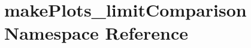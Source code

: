 \hypertarget{namespacemakePlots__limitComparison}{
\section{makePlots\_\-limitComparison Namespace Reference}
\label{namespacemakePlots__limitComparison}
}
